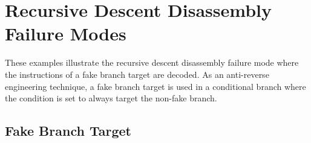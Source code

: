 




\section{Recursive Descent Disassembly Failure Modes}
\label{app:recursive_descent_disassembly_failure_modes}

These examples illustrate the recursive descent disassembly failure mode where the instructions of a fake branch target are decoded. As an anti-reverse engineering technique, a fake branch target is used in a conditional branch where the condition is set to always target the non-fake branch.


\subsection{Fake Branch Target}




